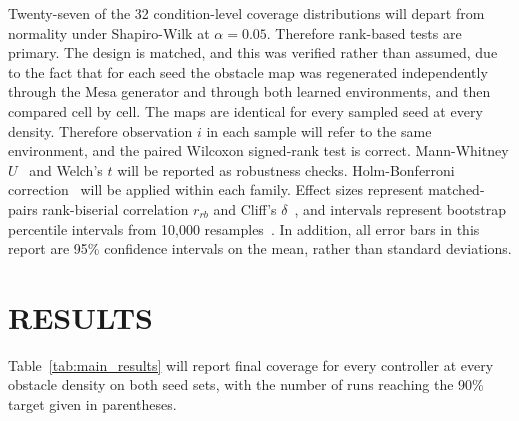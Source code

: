\documentclass[a4paper, 10pt, conference]{ieeeconf}
\begin{document}
Twenty-seven of the 32 condition-level coverage distributions will
depart from normality under Shapiro-Wilk at $\alpha = 0.05$. Therefore
rank-based tests are primary. The design is matched, and this was
verified rather than assumed, due to the fact that for each seed the
obstacle map was regenerated independently through the Mesa generator
and through both learned environments, and then compared cell by cell.
The maps are identical for every sampled seed at every density.
Therefore observation $i$ in each sample will refer to the same
environment, and the paired Wilcoxon signed-rank test is correct.
Mann-Whitney $U$~\cite{mann1947} and Welch's $t$ will be reported as
robustness checks. Holm-Bonferroni correction~\cite{holm1979} will be
applied within each family. Effect sizes represent matched-pairs
rank-biserial correlation $r_{rb}$ and Cliff's
$\delta$~\cite{cliff1993}, and intervals represent bootstrap
percentile intervals from 10{,}000 resamples~\cite{efron1979}. In
addition, all error bars in this report are 95\% confidence intervals
on the mean, rather than standard deviations.

\section{RESULTS}\label{sec:results}

Table~\ref{tab:main_results} will report final coverage for every
controller at every obstacle density on both seed sets, with the
number of runs reaching the 90\% target given in parentheses.
\end{document}
